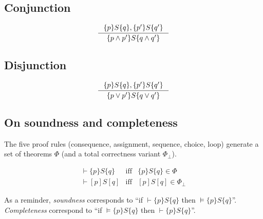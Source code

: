 \documentclass[12pt, a4paper]{book}
\begin{document}
    \subsection{Conjunction}

    \begin{center}
    \begin{minipage}{0.5\linewidth}
    \begin{framed}
        \[
        \inference{ \{ p \} S \{ q \}, \{ p' \} S \{ q' \} }
        { \{ p \land p' \} S \{ q \land q' \} }
        \]
    \end{framed}
    \end{minipage}
    \end{center}

    \subsection{Disjunction}

    \begin{center}
    \begin{minipage}{0.5\linewidth}
    \begin{framed}
        \[
        \inference{ \{ p \} S \{ q \}, \{ p' \} S \{ q' \} }
        { \{ p \lor p' \} S \{ q \lor q' \} }
        \]
    \end{framed}
    \end{minipage}
    \end{center}


    \subsection{On soundness and completeness}

    The five proof rules (consequence, assignment, sequence, choice, loop)
    generate a set of theorems $\Phi$ (and a total correctness variant
    $\Phi_{\perp}$).

    \begin{eqnarray*}
        \vdash \{ p \} S \{ q \} & \textrm{iff} & \{ p \} S \{ q \} \in \Phi \\
        \vdash [ p ] S [ q ] & \textrm{iff} & [ p ] S [ q ] \in \Phi_{\perp}
    \end{eqnarray*}

    As a reminder, \textit{soundness} corresponds to \enquote{if
    $\vdash \{ p \} S \{ q \}$ then $\models \{ p \} S \{ q \}$}.
    \textit{Completeness} correspond to \enquote{if $\models \{ p \} S \{ q \}$
    then $\vdash \{ p \} S \{ q \}$}.
\end{document}
